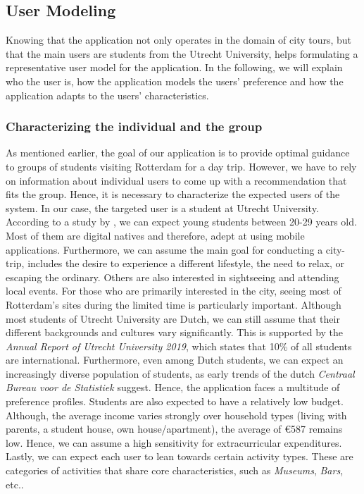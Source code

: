 \documentclass[11pt,a4paper,oneside]{article}
\begin{document}
\subsection{User Modeling}
\label{sec:UM}
Knowing that the application not only operates in the domain of city tours, but that the main users are students from the Utrecht University, helps formulating a representative user model for the application. In the following, we will explain who the user is, how the application models the users' preference and how the application adapts to the users' characteristics. 

\subsubsection{Characterizing the individual and the group}
As mentioned earlier, the goal of our application is to provide optimal guidance to groups of students visiting Rotterdam for a day trip. However, we have to rely on information about individual users to come up with a recommendation that fits the group. Hence, it is necessary to characterize the expected users of the system. In our case, the targeted user is a student at Utrecht University. According to a study by \citeauthor{AgeAverage_students}, we can expect young students between 20-29 years old.\cite{AgeAverage_students} Most of them are digital natives and therefore, adept at using mobile applications.\cite{prensky_DigitalNativesDigital_2001a} Furthermore, we can assume the main goal for conducting a city-trip, includes the desire to experience a different lifestyle, the need to relax, or escaping the ordinary. Others are also interested in sightseeing and attending local events.\cite{rita2019millennials} For those who are primarily interested in the city, seeing most of Rotterdam's sites during the limited time is particularly important. Although most students of Utrecht University are Dutch, we can still assume that their different backgrounds and cultures vary significantly. This is supported by the \emph{Annual Report of Utrecht University 2019}, which states that 10\% of all students are international.\cite{utrecht_UniversiteitUtrecht_2019} Furthermore, even among Dutch students, we can expect an increasingly diverse population of students, as early trends of the dutch \emph{Centraal Bureau voor de Statistiek} suggest.\cite{theovanmiltenburg_AllochtonenHogerOnderwijs_2007} Hence, the application faces a multitude of preference profiles. Students are also expected to have a relatively low budget. Although, the average income varies strongly over household types (living with parents, a student house, own house/apartment), the average of €587 remains low.\cite{kobus_OwnershipOncampusUse_2013} Hence, we can assume a high sensitivity for extracurricular expenditures. Lastly, we can expect each user to lean towards certain activity types. These are categories of activities that share core characteristics, such as \emph{Museums}, \emph{Bars}, etc.. 
\end{document}
